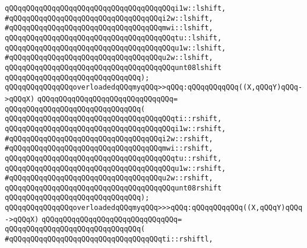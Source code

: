 \verb|qQQqqQQqqQQqqQQqqQQqqQQqqQQqqQQqqQQqqQQqi1w::lshift,|\newline
\verb|#qQQqqQQqqQQqqQQqqQQqqQQqqQQqqQQqqQQqi2w::lshift,|\newline
\verb|#qQQqqQQqqQQqqQQqqQQqqQQqqQQqqQQqqQQqmwi::lshift,|\newline
\verb|qQQqqQQqqQQqqQQqqQQqqQQqqQQqqQQqqQQqqQQqtu::lshift,|\newline
\verb|qQQqqQQqqQQqqQQqqQQqqQQqqQQqqQQqqQQqqQQqu1w::lshift,|\newline
\verb|#qQQqqQQqqQQqqQQqqQQqqQQqqQQqqQQqqQQqu2w::lshift,|\newline
\verb|qQQqqQQqqQQqqQQqqQQqqQQqqQQqqQQqqQQqqQQqunt08lshift|\newline
\verb|qQQqqQQqqQQqqQQqqQQqqQQqqQQqqQQq);|\newline
\newline
\verb|qQQqqQQqqQQqqQQqoverloadedqQQqmyqQQq>>qQQq:qQQqqQQqqQQq((X,qQQqY)qQQq->qQQqX)|\newline
\verb|qQQqqQQqqQQqqQQqqQQqqQQqqQQqqQQq=|\newline
\verb|qQQqqQQqqQQqqQQqqQQqqQQqqQQqqQQq(|\newline
\verb|qQQqqQQqqQQqqQQqqQQqqQQqqQQqqQQqqQQqqQQqti::rshift,|\newline
\verb|qQQqqQQqqQQqqQQqqQQqqQQqqQQqqQQqqQQqqQQqi1w::rshift,|\newline
\verb|#qQQqqQQqqQQqqQQqqQQqqQQqqQQqqQQqqQQqi2w::rshift,|\newline
\verb|#qQQqqQQqqQQqqQQqqQQqqQQqqQQqqQQqqQQqmwi::rshift,|\newline
\verb|qQQqqQQqqQQqqQQqqQQqqQQqqQQqqQQqqQQqqQQqtu::rshift,|\newline
\verb|qQQqqQQqqQQqqQQqqQQqqQQqqQQqqQQqqQQqqQQqu1w::rshift,|\newline
\verb|#qQQqqQQqqQQqqQQqqQQqqQQqqQQqqQQqqQQqu2w::rshift,|\newline
\verb|qQQqqQQqqQQqqQQqqQQqqQQqqQQqqQQqqQQqqQQqunt08rshift|\newline
\verb|qQQqqQQqqQQqqQQqqQQqqQQqqQQqqQQq);|\newline
\newline
\verb|qQQqqQQqqQQqqQQqoverloadedqQQqmyqQQq>>>qQQq:qQQqqQQqqQQq((X,qQQqY)qQQq->qQQqX)|\newline
\verb|qQQqqQQqqQQqqQQqqQQqqQQqqQQqqQQq=|\newline
\verb|qQQqqQQqqQQqqQQqqQQqqQQqqQQqqQQq(|\newline
\verb|#qQQqqQQqqQQqqQQqqQQqqQQqqQQqqQQqqQQqti::rshiftl,|\newline
